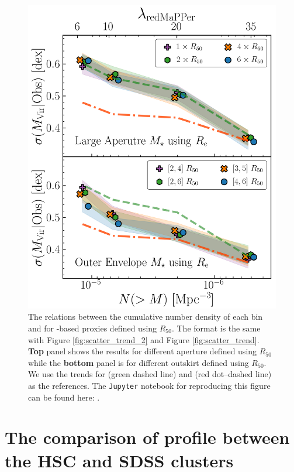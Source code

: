 \documentclass[fleqn,usenatbib,useAMS]{mnras}
\begin{document}
\begin{CJK*}{UTF8}{gbsn}
\begin{figure}
    \centering
    \includegraphics[width=\columnwidth]{figure/fig_E1}
    \caption{
        The relations between the cumulative number density of each \topn{} bin and \sigmvir{} 
        for \mstar{}-based \mvir{} proxies defined using $R_{50}$.
        The format is the same with Figure \ref{fig:scatter_trend_2} and Figure 
        \ref{fig:scatter_trend}.
        \textbf{Top} panel shows the \topn{} results for different aperture \mstar{} defined using 
        $R_{50}$ while the \textbf{bottom} panel is for different outskirt \mstar{} defined using 
        $R_{50}$.
        We use the \sigmvir{} trends for  (green dashed line) and  
        (red dot--dashed line) as the references.
        The \texttt{Jupyter} notebook for reproducing this figure can be found here:
        \href{https://github.com/dr-guangtou/jianbing/blob/master/notebooks/figure/figE1.ipynb}{\faGithub}.
    }
    \label{fig:scatter_trend_size}
\end{figure}

\section{The comparison of \texorpdfstring{\dsigma{}}{DSigma} profile between the HSC and SDSS \texorpdfstring{\redm{}}{redMaPPer} clusters}
	\label{app:sdss_redm}


\end{CJK*}
\end{document}
